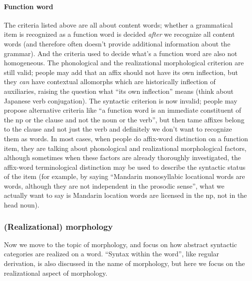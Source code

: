{\paragraph{Function word} The criteria listed above are all about content words;
whether a grammatical item is recognized as a function word 
is decided \emph{after} we recognize all content words
(and therefore often doesn't provide additional information about the grammar).
And the criteria used to decide what's a function word 
are also not homogeneous.
The phonological and the realizational morphological criterion are still valid;
people may add that an affix should not have its own inflection,
but they \emph{can} have contextual allomorphs 
which are historically inflection of auxiliaries,
raising the question what ``its own inflection'' means 
(think about Japanese verb conjugation).
The syntactic criterion is now invalid; 
people may propose alternative criteria like 
``a function word is an immediate constituent of the \acs{np} or the clause
and not the noun or the verb'',
but then \acs{tame} affixes belong to the clause and not just the verb
and definitely we don't want to recognize them as words.
In most cases, when people do affix-word distinction on a function item, 
they are talking about phonological and realizational morphological factors,
although sometimes when these factors are already thoroughly investigated, 
the affix-word terminological distinction may be used 
to describe the syntactic status of the item 
(for example, by saying ``Mandarin monosyllabic locational words 
are words, although they are not independent in the prosodic sense'',
what we actually want to say is Mandarin location words are licensed 
in the \acs{np}, not in the head noun).

\subsubsection{(Realizational) morphology}

Now we move to the topic of morphology,
and focus on how abstract syntactic categories are realized on a word.
``Syntax within the word'',
like regular derivation,
is also discussed in the name of morphology,
but here we focus on the realizational aspect of morphology.

}
